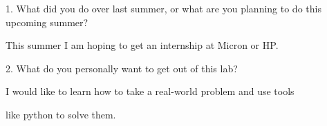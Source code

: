 \documentclass[12pt, a4paper]{article}
\begin{document}
    1. What did you do over last summer, or what are you 
    planning to do this upcoming summer?

    \vspace{5mm}

    \quad This summer I am hoping to get an internship at Micron or HP.

    \vspace{5mm}

    2. What do you personally want to get out of this lab?

    \vspace{5mm}
    
    \quad I would like to learn how to take a real-world problem and use tools 
    
    \quad like python to solve them.

    
\end{document}

